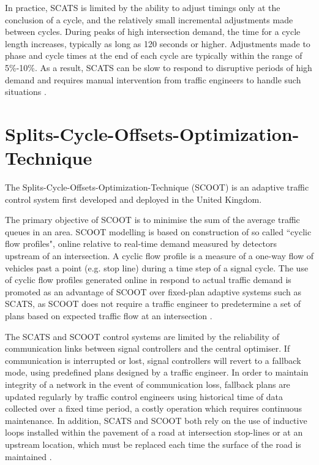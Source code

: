 In practice, SCATS is limited by the ability to adjust timings only at the conclusion of a cycle, and the relatively small incremental adjustments made between cycles. During peaks of high intersection demand, the time for a cycle length increases, typically as long as 120 seconds or higher. Adjustments made to phase and cycle times at the end of each cycle are typically within the range of 5\%-10\%. As a result, SCATS can be slow to respond to disruptive periods of high demand and requires manual intervention from traffic engineers to handle such situations \cite{scatstraining}.

\section{Splits-Cycle-Offsets-Optimization-Technique}

The Splits-Cycle-Offsets-Optimization-Technique (SCOOT) is an adaptive traffic control system first developed and deployed in the United Kingdom.

The primary objective of SCOOT is to minimise the sum of the average traffic queues in an area. SCOOT modelling is based on construction of so called ``cyclic flow profiles", online relative to real-time demand measured by detectors upstream of an intersection. A cyclic flow profile is a measure of a one-way flow of vehicles past a point (e.g. stop line) during a time step of a signal cycle. The use of cyclic flow profiles generated online in respond to actual traffic demand is promoted as an advantage of SCOOT over fixed-plan adaptive systems such as SCATS, as SCOOT does not require a traffic engineer to predetermine a set of plans based on expected traffic flow at an intersection \cite{bell1992future,robertson1991optimizing}.

The SCATS and SCOOT control systems are limited by the reliability of communication links between signal controllers and the central optimiser. If communication is interrupted or lost, signal controllers will revert to a fallback mode, using predefined plans designed by a traffic engineer. In order to maintain integrity of a network in the event of communication loss, fallback plans are updated regularly by traffic control engineers using historical time of data collected over a fixed time period, a costly operation which requires continuous maintenance. In addition, SCATS and SCOOT both rely on the use of inductive loops installed within the pavement of a road at intersection stop-lines or at an upstream location, which must be replaced each time the surface of the road is maintained  \cite{bell1992future}.

